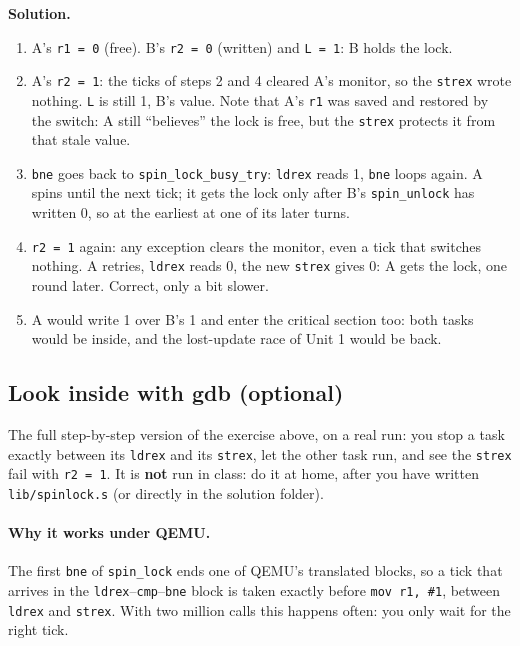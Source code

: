 \textbf{Solution.}
\begin{enumerate}
    \item A's \texttt{r1 = 0} (free). B's \texttt{r2 = 0} (written) and \texttt{L = 1}: B holds the lock.
    \item A's \texttt{r2 = 1}: the ticks of steps 2 and 4 cleared A's monitor, so the \texttt{strex} wrote nothing. \texttt{L} is still 1, B's value. Note that A's \texttt{r1} was saved and restored by the switch: A still ``believes'' the lock is free, but the \texttt{strex} protects it from that stale value.
    \item \texttt{bne} goes back to \texttt{spin\_lock\_busy\_try}: \texttt{ldrex} reads 1, \texttt{bne} loops again. A spins until the next tick; it gets the lock only after B's \texttt{spin\_unlock} has written 0, so at the earliest at one of its later turns.
    \item \texttt{r2 = 1} again: any exception clears the monitor, even a tick that switches nothing. A retries, \texttt{ldrex} reads 0, the new \texttt{strex} gives 0: A gets the lock, one round later. Correct, only a bit slower.
    \item A would write 1 over B's 1 and enter the critical section too: both tasks would be inside, and the lost-update race of Unit 1 would be back.
\end{enumerate}

\subsection{Look inside with gdb (optional)}
The full step-by-step version of the exercise above, on a real run: you stop a task exactly between its \texttt{ldrex} and its \texttt{strex}, let the other task run, and see the \texttt{strex} fail with \texttt{r2 = 1}. It is \textbf{not} run in class: do it at home, after you have written \texttt{lib/spinlock.s} (or directly in the solution folder).

\paragraph{Why it works under QEMU.} The first \texttt{bne} of \texttt{spin\_lock} ends one of QEMU's translated blocks, so a tick that arrives in the \texttt{ldrex}--\texttt{cmp}--\texttt{bne} block is taken exactly before \texttt{mov r1, \#1}, between \texttt{ldrex} and \texttt{strex}. With two million calls this happens often: you only wait for the right tick.

